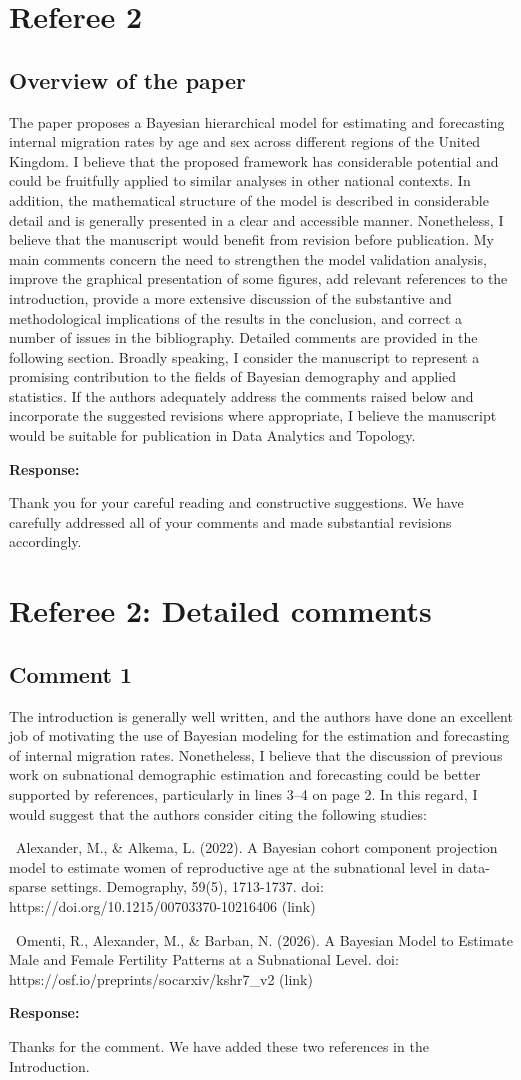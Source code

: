 \documentclass[11pt,a4paper]{article}
\newlength{\replyspace}
\newenvironment{response}{\par\addvspace{\replyspace}\nopagebreak\textbf{\textcolor{replyblue}{Response:}}\par\begingroup\color{replyblue}}{\par\endgroup\vspace{\replyspace}}
\newcommand{\refcomment}[2]{\par\Needspace{5\baselineskip}\subsection*{#1}#2\par}
\begin{document}
\clearpage
\section*{Referee 2}
\refcomment{Overview of the paper}{
The paper proposes a Bayesian hierarchical model for estimating and forecasting internal migration rates by age and sex across different regions of the United Kingdom. I believe that the proposed framework has considerable potential and could be fruitfully applied to similar analyses in other national contexts. In addition, the mathematical structure of the model is described in considerable detail and is generally presented in a clear and accessible manner. Nonetheless, I believe that the manuscript would benefit from revision before publication. My main comments concern the need to strengthen the model validation analysis, improve the graphical presentation of some figures, add relevant references to the introduction, provide a more extensive discussion of the substantive and methodological implications of the results in the conclusion, and correct a number of issues in the bibliography. Detailed comments are provided in the following section. Broadly speaking, I consider the manuscript to represent a promising contribution to the fields of Bayesian demography and applied statistics. If the authors adequately address the comments raised below and incorporate the suggested revisions where appropriate, I believe the manuscript would be suitable for publication in Data Analytics and Topology.
}
\begin{response}
Thank you for your careful reading and constructive suggestions. We have carefully addressed all
of your comments and made substantial revisions accordingly.
\end{response}

\section*{Referee 2: Detailed comments}
\refcomment{Comment 1}{
The introduction is generally well written, and the authors have done an excellent job of motivating the use of Bayesian modeling for the estimation and forecasting of internal migration rates. Nonetheless, I believe that the discussion of previous work on subnational demographic estimation and forecasting could be better supported by references, particularly in lines 3--4 on page 2. In this regard, I would suggest that the authors consider citing the following studies: \par\smallskip\noindent\textbullet\ Alexander, M., \& Alkema, L. (2022). A Bayesian cohort component projection model to estimate women of reproductive age at the subnational level in data-sparse settings. Demography, 59(5), 1713-1737. doi: https://doi.org/10.1215/00703370-10216406 (link) \par\smallskip\noindent\textbullet\ Omenti, R., Alexander, M., \& Barban, N. (2026). A Bayesian Model to Estimate Male and Female Fertility Patterns at a Subnational Level. doi: https://osf.io/preprints/socarxiv/kshr7\_v2 (link)
}
\begin{response}
Thanks for the comment.  We have added these two references in the Introduction.
\end{response}
\end{document}
